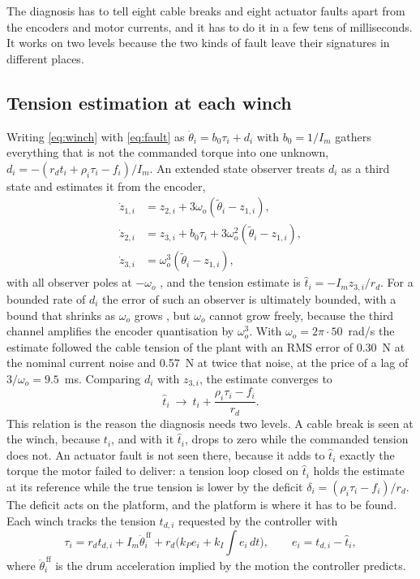 \documentclass[a4paper,fleqn]{cas-dc}
\begin{document}
The diagnosis has to tell eight cable breaks and eight actuator faults apart from the encoders and motor currents, and it has to do it in a few tens of milliseconds. It works on two levels because the two kinds of fault leave their signatures in different places.

\subsection{Tension estimation at each winch}\label{sec:eso}

Writing \eqref{eq:winch} with \eqref{eq:fault} as $\ddot\theta_i=b_0\tau_i+d_i$ with $b_0=1/I_m$ gathers everything that is not the commanded torque into one unknown, $d_i=-(r_dt_i+\rho_i\tau_i-f_i)/I_m$. An extended state observer \citep{han2009pid} treats $d_i$ as a third state and estimates it from the encoder,
\begin{equation}\label{eq:eso}
\begin{aligned}
\dot z_{1,i}&=z_{2,i}+3\omega_o(\tilde\theta_i-z_{1,i}),\\
\dot z_{2,i}&=z_{3,i}+b_0\tau_i+3\omega_o^2(\tilde\theta_i-z_{1,i}),\\
\dot z_{3,i}&=\omega_o^3(\tilde\theta_i-z_{1,i}),
\end{aligned}
\end{equation}
with all observer poles at $-\omega_o$ \citep{gao2003scaling}, and the tension estimate is $\hat t_i=-I_m z_{3,i}/r_d$. For a bounded rate of $d_i$ the error of such an observer is ultimately bounded, with a bound that shrinks as $\omega_o$ grows \citep{guo2011eso}, but $\omega_o$ cannot grow freely, because the third channel amplifies the encoder quantisation by $\omega_o^3$. With $\omega_o=2\pi\cdot50$~rad/s the estimate followed the cable tension of the plant with an RMS error of 0.30~N at the nominal current noise and 0.57~N at twice that noise, at the price of a lag of $3/\omega_o=9.5$~ms. Comparing $d_i$ with $z_{3,i}$, the estimate converges to
\begin{equation}\label{eq:bias}
\hat t_i\ \to\ t_i+\frac{\rho_i\tau_i-f_i}{r_d}.
\end{equation}
This relation is the reason the diagnosis needs two levels. A cable break is seen at the winch, because $t_i$, and with it $\hat t_i$, drops to zero while the commanded tension does not. An actuator fault is not seen there, because it adds to $\hat t_i$ exactly the torque the motor failed to deliver: a tension loop closed on $\hat t_i$ holds the estimate at its reference while the true tension is lower by the deficit $\delta_i=(\rho_i\tau_i-f_i)/r_d$. The deficit acts on the platform, and the platform is where it has to be found. Each winch tracks the tension $t_{d,i}$ requested by the controller with
\begin{equation}\label{eq:loop}
\tau_i=r_dt_{d,i}+I_m\ddot\theta_i^{\,\mathrm{ff}}+r_d\Big(k_Pe_i+k_I\!\int e_i\,dt\Big),\qquad e_i=t_{d,i}-\hat t_i,
\end{equation}
where $\ddot\theta_i^{\,\mathrm{ff}}$ is the drum acceleration implied by the motion the controller predicts.
\end{document}
